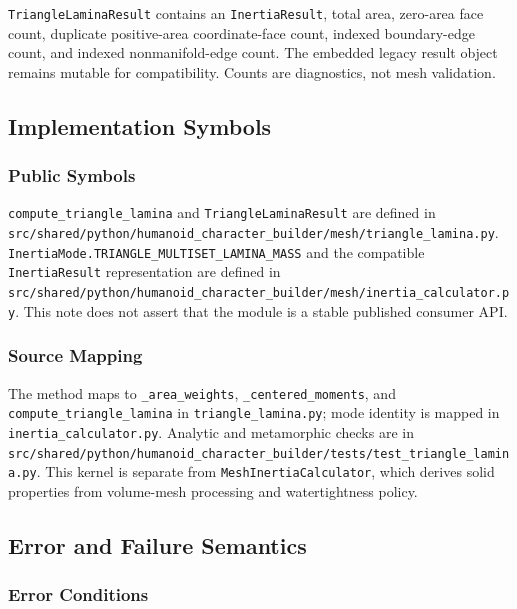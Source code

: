 \documentclass[
  american,
]{article}
\begin{document}
\texttt{TriangleLaminaResult} contains an \texttt{InertiaResult}, total
area, zero-area face count, duplicate positive-area coordinate-face
count, indexed boundary-edge count, and indexed nonmanifold-edge count.
The embedded legacy result object remains mutable for compatibility.
Counts are diagnostics, not mesh validation.

\subsection{Implementation Symbols}\label{implementation-symbols-1}

\subsubsection{Public Symbols}\label{public-symbols-1}

\texttt{compute\_triangle\_lamina} and \texttt{TriangleLaminaResult} are
defined in
\texttt{src/shared/python/humanoid\_character\_builder/mesh/triangle\_lamina.py}.
\texttt{InertiaMode.TRIANGLE\_MULTISET\_LAMINA\_MASS} and the compatible
\texttt{InertiaResult} representation are defined in
\texttt{src/shared/python/humanoid\_character\_builder/mesh/inertia\_calculator.py}.
This note does not assert that the module is a stable published consumer
API.

\subsubsection{Source Mapping}\label{source-mapping-1}

The method maps to \texttt{\_area\_weights},
\texttt{\_centered\_moments}, and \texttt{compute\_triangle\_lamina} in
\texttt{triangle\_lamina.py}; mode identity is mapped in
\texttt{inertia\_calculator.py}. Analytic and metamorphic checks are in
\texttt{src/shared/python/humanoid\_character\_builder/tests/test\_triangle\_lamina.py}.
This kernel is separate from \texttt{MeshInertiaCalculator}, which
derives solid properties from volume-mesh processing and watertightness
policy.

\subsection{Error and Failure
Semantics}\label{error-and-failure-semantics-1}

\subsubsection{Error Conditions}\label{error-conditions-1}
\end{document}
